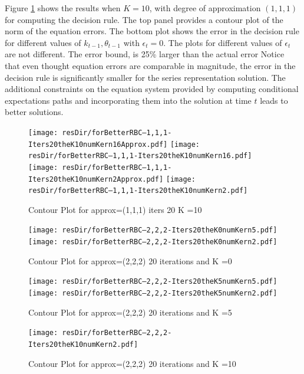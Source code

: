 \documentclass[12pt]{article}
\begin{document}
Figure \ref{fig:cntpltC} shows the results when $K=10$, with degree of approximation $(1,1,1)$
for computing the decision rule.  The top panel provides a contour plot of the
norm of the equation errors. The bottom plot shows the error in the decision rule for different values of $k_{t-1}, \theta_{t-1}$ with $\epsilon_t=0$.  The plots for different values of $\epsilon_t$ are not different.  The error bound,  is 25\% larger than the actual error   Notice that even thought equation errors are comparable in magnitude, the error in the decision rule is significantly smaller for the series representation solution.  The additional constraints on the equation system provided by computing conditional expectations paths and incorporating them into the solution at time $t$ leads to better solutions.



\begin{figure}
  \centering
\iflinux
  \texttt{[image: resDir/forBetterRBC--1,1,1-Iters20theK10numKern16Approx.pdf]}
  \texttt{[image: resDir/forBetterRBC--1,1,1-Iters20theK10numKern16.pdf]}
\fi
\ifmacosx
  \texttt{[image: resDir/forBetterRBC--1,1,1-Iters20theK10numKern2Approx.pdf]}
  \texttt{[image: resDir/forBetterRBC--1,1,1-Iters20theK10numKern2.pdf]}
\fi
  \caption{Contour Plot for approx=(1,1,1) iters 20 K =10}
  \label{fig:cntpltC}
\end{figure}

\begin{figure}
  \centering
\iflinux  
\texttt{[image: resDir/forBetterRBC--2,2,2-Iters20theK0numKern5.pdf]}
\fi
\ifmacosx  
\texttt{[image: resDir/forBetterRBC--2,2,2-Iters20theK0numKern2.pdf]}
\fi
  \caption{Contour Plot for approx=(2,2,2) 20 iterations and K =0}
  \label{fig:cntpltD}
\end{figure}

\begin{figure}
  \centering
\iflinux
  \texttt{[image: resDir/forBetterRBC--2,2,2-Iters20theK5numKern5.pdf]}
\fi
\ifmacosx  
\texttt{[image: resDir/forBetterRBC--2,2,2-Iters20theK5numKern2.pdf]}
\fi
  \caption{Contour Plot for approx=(2,2,2) 20 iterations and K =5}
  \label{fig:cntpltE}
\end{figure}

\begin{figure}
  \centering
\ifmacosx
  \texttt{[image: resDir/forBetterRBC--2,2,2-Iters20theK10numKern2.pdf]}
\fi
  \caption{Contour Plot for approx=(2,2,2) 20 iterations and K =10}
  \label{fig:cntpltF}
\end{figure}
\end{document}
